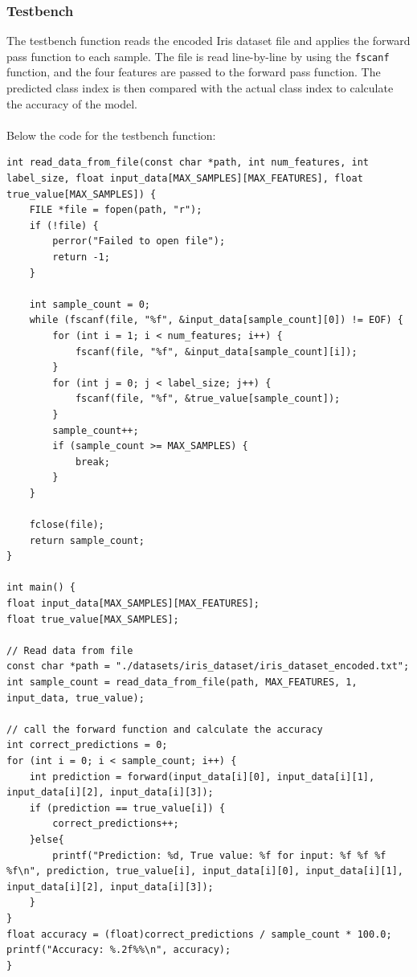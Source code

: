 \documentclass{article}
\begin{document}
\subsubsection{Testbench}
The testbench function reads the encoded Iris dataset file and applies the forward pass function to each sample.
The file is read line-by-line by using the \texttt{fscanf} function, and the four features are passed to the forward pass function.
The predicted class index is then compared with the actual class index to calculate the accuracy of the model.
\\\\Below the code for the testbench function:
\begin{lstlisting}
int read_data_from_file(const char *path, int num_features, int label_size, float input_data[MAX_SAMPLES][MAX_FEATURES], float true_value[MAX_SAMPLES]) {
    FILE *file = fopen(path, "r");
    if (!file) {
        perror("Failed to open file");
        return -1;
    }

    int sample_count = 0;
    while (fscanf(file, "%f", &input_data[sample_count][0]) != EOF) {
        for (int i = 1; i < num_features; i++) {
            fscanf(file, "%f", &input_data[sample_count][i]);
        }
        for (int j = 0; j < label_size; j++) {
            fscanf(file, "%f", &true_value[sample_count]);
        }
        sample_count++;
        if (sample_count >= MAX_SAMPLES) {
            break;
        }
    }

    fclose(file);
    return sample_count;
}

int main() {
float input_data[MAX_SAMPLES][MAX_FEATURES];
float true_value[MAX_SAMPLES];

// Read data from file
const char *path = "./datasets/iris_dataset/iris_dataset_encoded.txt";
int sample_count = read_data_from_file(path, MAX_FEATURES, 1, input_data, true_value);

// call the forward function and calculate the accuracy
int correct_predictions = 0;
for (int i = 0; i < sample_count; i++) {
    int prediction = forward(input_data[i][0], input_data[i][1], input_data[i][2], input_data[i][3]);
    if (prediction == true_value[i]) {
        correct_predictions++;
    }else{
        printf("Prediction: %d, True value: %f for input: %f %f %f %f\n", prediction, true_value[i], input_data[i][0], input_data[i][1], input_data[i][2], input_data[i][3]);
    }
}
float accuracy = (float)correct_predictions / sample_count * 100.0;
printf("Accuracy: %.2f%%\n", accuracy);
}
\end{lstlisting}
\end{document}
